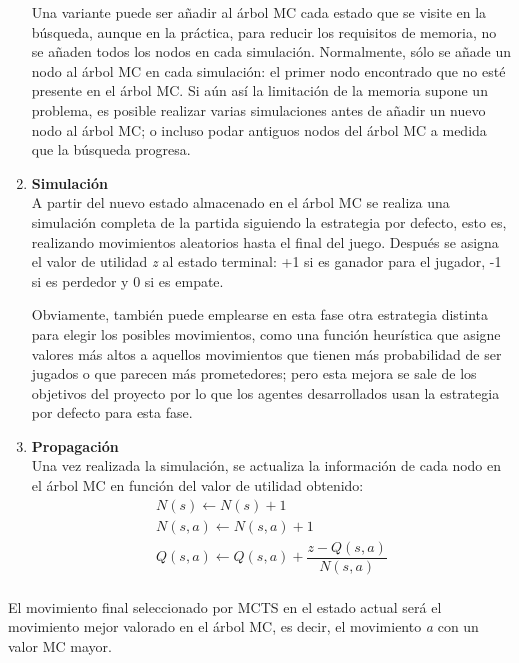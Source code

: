 \begin{enumerate}
Una variante puede ser añadir al árbol MC cada estado que se visite en la búsqueda, aunque en la práctica, para reducir los requisitos de memoria, no se añaden todos los nodos en cada simulación.
Normalmente, sólo se añade un nodo al árbol MC en cada simulación: el primer nodo encontrado que no esté presente en el árbol MC.
Si aún así la limitación de la memoria supone un problema, es posible realizar varias simulaciones antes de añadir un nuevo nodo al árbol MC; o incluso podar antiguos nodos del árbol MC a medida que la búsqueda progresa.

	\item \textbf{Simulación} \\
A partir del nuevo estado almacenado en el árbol MC se realiza una simulación completa de la partida siguiendo la estrategia por defecto, esto es, realizando movimientos aleatorios hasta el final del juego.
Después se asigna el valor de utilidad \textit{z} al estado terminal: +1 si es ganador para el jugador, -1 si es perdedor y 0 si es empate.

Obviamente, también puede emplearse en esta fase otra estrategia distinta para elegir los posibles movimientos, como una función heurística que asigne valores más altos a aquellos movimientos que tienen más probabilidad de ser jugados o que parecen más prometedores; pero esta mejora se sale de los objetivos del proyecto por lo que los agentes desarrollados usan la estrategia por defecto para esta fase.

	\item \textbf{Propagación} \\
	Una vez realizada la simulación, se actualiza la información de cada nodo en el árbol MC en función del valor de utilidad obtenido:
	\begin{displaymath}
		\begin{array}{l}
		N(s) \leftarrow N(s) + 1 \\
		N(s,a) \leftarrow N(s,a) + 1 \\ 
		Q(s,a) \leftarrow Q(s,a) + \dfrac{z - Q(s,a)}{N(s,a)} \\
		\end{array}
	\end{displaymath}

\end{enumerate}

El movimiento final seleccionado por MCTS en el estado actual será el movimiento mejor valorado en el árbol MC, es decir, el movimiento \textit{a} con un valor MC mayor.

